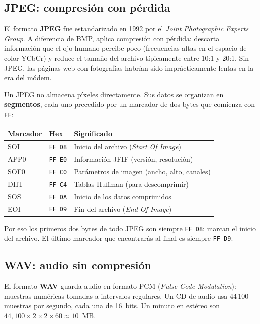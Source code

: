 \documentclass[12pt, oneside]{article}
\begin{document}
\subsection{JPEG: compresión con pérdida}

El formato \textbf{JPEG} fue estandarizado en 1992 por el
\textit{Joint Photographic Experts Group}.  A diferencia de BMP, aplica
compresión con pérdida: descarta información que el ojo humano percibe
poco (frecuencias altas en el espacio de color YCbCr) y reduce el tamaño
del archivo típicamente entre 10:1 y 20:1.  Sin JPEG, las páginas web con
fotografías habrían sido imprácticamente lentas en la era del módem.

Un JPEG no almacena píxeles directamente.  Sus datos se organizan en
\textbf{segmentos}, cada uno precedido por un marcador de dos bytes que
comienza con \texttt{FF}:

\begin{center}
\begin{tabular}{lll}
  \toprule
  \textbf{Marcador} & \textbf{Hex} & \textbf{Significado} \\
  \midrule
  SOI  & \texttt{FF D8} & Inicio del archivo (\textit{Start Of Image}) \\
  APP0 & \texttt{FF E0} & Información JFIF (versión, resolución) \\
  SOF0 & \texttt{FF C0} & Parámetros de imagen (ancho, alto, canales) \\
  DHT  & \texttt{FF C4} & Tablas Huffman (para descomprimir) \\
  SOS  & \texttt{FF DA} & Inicio de los datos comprimidos \\
  EOI  & \texttt{FF D9} & Fin del archivo (\textit{End Of Image}) \\
  \bottomrule
\end{tabular}
\end{center}

Por eso los primeros dos bytes de todo JPEG son siempre \texttt{FF D8}:
marcan el inicio del archivo.  El último marcador que encontrarás al
final es siempre \texttt{FF D9}.

\subsection{WAV: audio sin compresión}

El formato \textbf{WAV} guarda audio en formato PCM
(\textit{Pulse-Code Modulation}): muestras numéricas tomadas a intervalos
regulares.  Un CD de audio usa 44\,100 muestras por segundo, cada una de
16~bits.  Un minuto en estéreo son
$44{,}100 \times 2 \times 2 \times 60 \approx 10$~MB.
\end{document}
